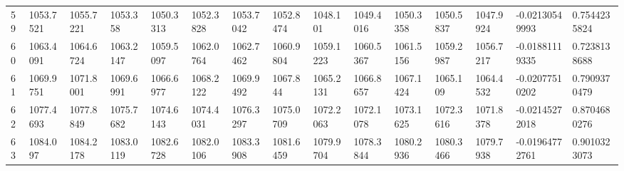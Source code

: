 \begin{landscape}
{\begin{longtable}{@{}lllllllllllllll@{}}
		59                                           & 1053.7521                & 1055.7221                & 1053.358                 & 1050.3313                & 1052.3828                & 1053.7042                & 1052.8474                & 1048.101                 & 1049.4016                & 1050.3358                & 1050.5837                & 1047.9924                & -0.02130549993                                                         & 0.7544235824                                    \\
		60                                           & 1063.4091                & 1064.6724                & 1063.2147                & 1059.5097                & 1062.0764                & 1062.7462                & 1060.9804                & 1059.1223                & 1060.5367                & 1061.5156                & 1059.2987                & 1056.7217                & -0.01881119335                                                         & 0.7238138688                                    \\
		61                                           & 1069.9751                & 1071.8001                & 1069.6991                & 1066.6977                & 1068.2122                & 1069.9492                & 1067.844                 & 1065.2131                & 1066.8657                & 1067.1424                & 1065.109                 & 1064.4532                & -0.02077510202                                                         & 0.7909370479                                    \\
		62                                           & 1077.4693                & 1077.8849                & 1075.7682                & 1074.6143                & 1074.4031                & 1076.3297                & 1075.0709                & 1072.2063                & 1072.1078                & 1073.1625                & 1072.3616                & 1071.8378                & -0.02145272018                                                         & 0.8704680276                                    \\
		63                                           & 1084.097                 & 1084.2178                & 1083.0119                & 1082.6728                & 1082.0106                & 1083.3908                & 1081.6459                & 1079.9704                & 1078.3844                & 1080.2936                & 1080.3466                & 1079.7938                & -0.01964772761                                                         & 0.9010323073                                    \\

\end{longtable}}
\end{landscape}
